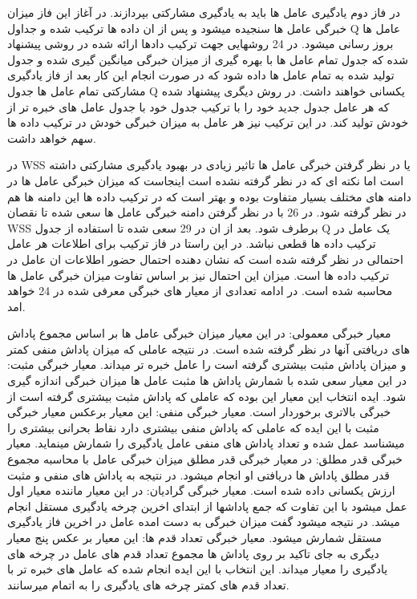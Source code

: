 در فاز دوم یادگیری عامل ها باید به یادگیری مشارکتی بپردازند. در آغاز این فاز میزان خبرگی عامل ها سنجیده میشود و پس از ان داده ها ترکیب شده و جداول Q  عامل ها بروز رسانی میشود. در 24 روشهایی جهت ترکیب دادها ارائه شده در روشی پیشنهاد شده که جدول تمام عامل ها با بهره گیری از میزان خبرگی میانگین گیری شده و جدول تولید شده به تمام عامل ها داده شود که در صورت انجام این کار بعد از فاز یادگیری مشارکتی تمام عامل ها جدول Q یکسانی خواهند داشت. در روش دیگری پیشنهاد شده که هر عامل جدول جدید خود را با ترکیب جدول خود با جدول عامل های خبره تر از خودش تولید کند. در این ترکیب نیز هر عامل به میزان خبرگی خودش در ترکیب داده ها سهم خواهد داشت.

در WSS یا در نظر گرفتن خبرگی عامل ها تاثیر زیادی در بهبود یادگیری مشارکتی داشته است اما نکته ای که در نظر گرفته نشده است اینجاست که میزان خبرگی عامل ها در دامنه های مختلف بسیار متفاوت بوده و بهتر است که در ترکیب داده ها این دامنه ها هم در نظر گرفته شود. در 26 با در نظر گرفتن دامنه خبرگی عامل ها سعی شده تا  نقصان WSS برطرف شود. بعد از ان در 29 سعی شده تا استفاده از جدول Q یک عامل در ترکیب داده ها قطعی نباشد. در این راستا در فاز ترکیب برای اطلاعات هر عامل احتمالی در نظر گرفته شده است  که نشان دهنده احتمال حضور اطلاعات ان عامل در ترکیب داده ها است. میزان این احتمال نیز بر اساس تفاوت میزان خبرگی عامل ها محاسبه شده است. در ادامه تعدادی از معیار های خبرگی معرفی شده در 24 خواهد امد.

معیار خبرگی معمولی: در این معیار میزان خبرگی عامل ها بر اساس مجموع پاداش های دریافتی آنها در نظر گرفته شده است. در نتیجه عاملی که میزان پاداش منفی کمتر و میزان پاداش مثبت بیشتری گرفته است را عامل خبره تر میداند.
معیار خبرگی مثبت: در این معیار سعی شده با شمارش پاداش ها مثبت عامل ها میزان خبرگی اندازه گیری شود. ایده انتخاب این معیار این بوده که عاملی که پاداش مثبت بیشتری گرفته است از خبرگی بالاتری برخوردار است.
معیار خبرگی منفی: این معیار برعکس معیار خبرگی مثبت با این ایده که عاملی که پاداش منفی بیشتری دارد نقاط بحرانی بیشتری را میشناسد عمل شده و تعداد پاداش های منفی عامل یادگیری را شمارش مینماید.
معیار خبرگی قدر مطلق: در معیار خبرگی قدر مطلق میزان خبرگی عامل با محاسبه مجموع قدر مطلق پاداش ها دریافتی او انجام میشود. در نتیجه به پاداش های منفی و مثبت ارزش یکسانی داده شده است.
معیار خبرگی گرادیان: در این معیار  ماننده معیار اول عمل میشود با این تفاوت که جمع پاداشها از ابتدای اخرین چرخه یادگیری مستقل انجام میشد. در نتیجه میشود گفت میزان خبرگی به دست امده عامل در اخرین فاز یادگیری مستقل شمارش میشود.
معیار خبرگی تعداد قدم ها: این معیار بر عکس پنج معیار دیگری به جای تاکید بر روی پاداش ها مجموع تعداد قدم های عامل در چرخه های یادگیری را معیار میداند. این انتخاب با این ایده انجام شده که عامل های خبره تر با تعداد قدم های کمتر چرخه های یادگیری را به اتمام میرسانند.

